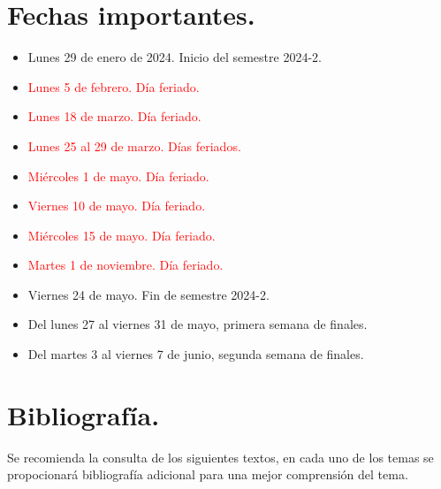 \section{Fechas importantes.}

\begin{itemize}
\setlength\itemsep{1pt}
\item Lunes 29 de enero de 2024. Inicio del semestre 2024-2.
\item \textcolor{red}{Lunes 5 de febrero. Día feriado.}
\item \textcolor{red}{Lunes 18 de marzo. Día feriado.}
\item \textcolor{red}{Lunes 25 al 29 de marzo. Días feriados.}
\item \textcolor{red}{Miércoles 1 de mayo. Día feriado.}
\item \textcolor{red}{Viernes 10 de mayo. Día feriado.}
\item \textcolor{red}{Miércoles 15 de mayo. Día feriado.}
\item \textcolor{red}{Martes 1 de noviembre. Día feriado.}
\item Viernes 24 de mayo. Fin de semestre 2024-2.
\item Del lunes 27 al viernes 31 de mayo, primera semana de finales.
\item Del martes 3 al viernes 7 de junio, segunda semana de finales.
\end{itemize}

\section{Bibliografía.}

Se recomienda la consulta de los siguientes textos, en cada uno de los temas se propocionará bibliografía adicional para una mejor comprensión del tema.

